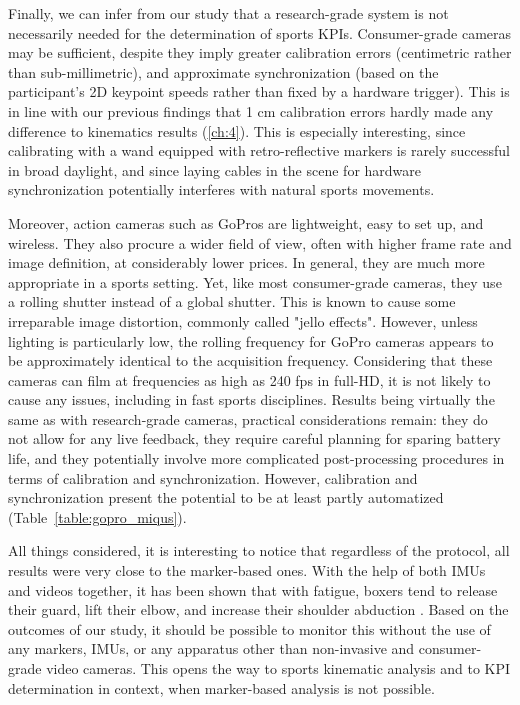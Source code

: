 Finally, we can infer from our study that a research-grade system is not necessarily needed for the determination of sports KPIs. Consumer-grade cameras may be sufficient, despite they imply greater calibration errors (centimetric rather than sub-millimetric), and approximate synchronization (based on the participant's 2D keypoint speeds rather than fixed by a hardware trigger). This is in line with our previous findings that 1 cm calibration errors hardly made any difference to kinematics results \cite{Pagnon2021} (\autoref{ch:4}). This is especially interesting, since calibrating with a wand equipped with retro-reflective markers is rarely successful in broad daylight, and since laying cables in the scene for hardware synchronization potentially interferes with natural sports movements. 

Moreover, action cameras such as GoPros are lightweight, easy to set up, and wireless. They also procure a wider field of view, often with higher frame rate and image definition, at considerably lower prices. In general, they are much more appropriate in a sports setting. Yet, like most consumer-grade cameras, they use a rolling shutter instead of a global shutter. This is known to cause some irreparable image distortion, commonly called "jello effects". However, unless lighting is particularly low, the rolling frequency for GoPro cameras appears to be approximately identical to the acquisition frequency. Considering that these cameras can film at frequencies as high as 240 fps in full-HD, it is not likely to cause any issues, including in fast sports disciplines. Results being virtually the same as with research-grade cameras, practical considerations remain: they do not allow for any live feedback, they require careful planning for sparing battery life, and they potentially involve more complicated post-processing procedures in terms of calibration and synchronization. However, calibration and synchronization present the potential to be at least partly automatized (Table~\ref{table:gopro_miqus}).

All things considered, it is interesting to notice that regardless of the protocol, all results were very close to the marker-based ones. With the help of both IMUs and videos together, it has been shown that with fatigue, boxers tend to release their guard, lift their elbow, and increase their shoulder abduction \cite{Haralabidis2020}. Based on the outcomes of our study, it should be possible to monitor this without the use of any markers, IMUs, or any apparatus other than non-invasive and consumer-grade video cameras. This opens the way to sports kinematic analysis and to KPI determination in context, when marker-based analysis is not possible. 


